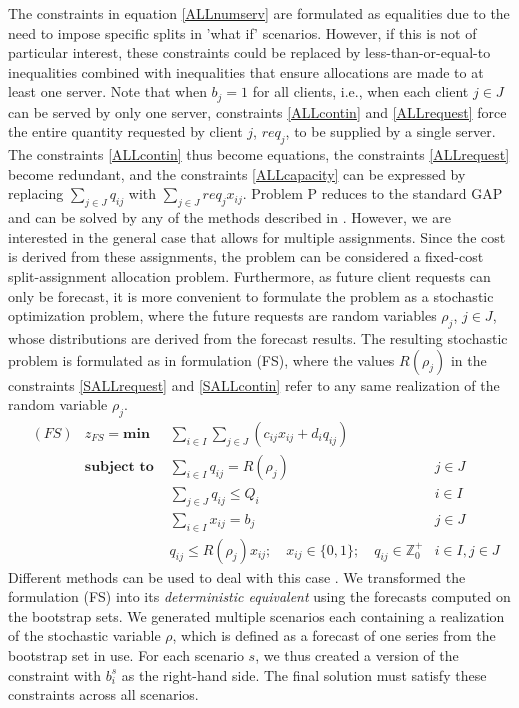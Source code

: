 \documentclass[ijoc,sglanonrev]{informs4}
\begin{document}
{ 
The constraints in equation \ref{ALLnumserv} are formulated as equalities due to the need to impose specific splits in 'what if' scenarios. However, if this is not of particular interest, these constraints could be replaced by less-than-or-equal-to inequalities combined with inequalities that ensure allocations are made to at least one server.
Note that when $b_j = 1$ for all clients, i.e., when each client $j \in J$ can be served by only one server, constraints \ref{ALLcontin} and \ref{ALLrequest} force the entire quantity requested by client $j$, $req_j$, to be supplied by a single server. The constraints \ref{ALLcontin} thus become equations, the constraints \ref{ALLrequest} become redundant, and the constraints \ref{ALLcapacity} can be expressed by replacing $\sum_{j \in J}q_{ij}$ with $\sum_{j \in J}req_j x_{ij}$. Problem P reduces to the standard GAP and can be solved by any of the methods described in \citet{matheuristics}.
}
However, we are interested in the general case that allows for multiple assignments. Since the cost is derived from these assignments, the problem can be considered a fixed-cost split-assignment allocation problem.
Furthermore, as future client requests can only be forecast, it is more convenient to formulate the problem as a stochastic optimization problem, where the future requests are random variables $\rho_j$, $j \in J$, whose distributions are derived from the forecast results. The resulting stochastic problem is formulated as in formulation (FS), where the values $R(\rho_j)$ in the constraints \ref{SALLrequest} and \ref{SALLcontin} refer to any same realization of the random variable $\rho_j$.
\begin{align}
	&(FS) & z_{FS} = \textbf{min } & \sum_{i \in I} \sum_{j \in J} ( c_{ij}x_{ij} + d_i q_{ij} ) \label{SALLobj}\\
	& &  \textbf{subject to }
	& \sum_{i \in I} q_{ij} = R(\rho_j) & j \in J  \label{SALLrequest}\\
	& &  & \sum_{j \in J}q_{ij} \leq Q_i & i \in I \label{SALLcapacity}\\
	& &  & \sum_{i \in I} x_{ij} = b_j & j \in J  \label{SALLnumserv}\\
	& &  & q_{ij} \leq R(\rho_j) x_{ij}; \quad  x_{ij} \in \{0,1\}; \quad q_{ij} \in \mathbb{Z}^+_0 & i \in I, j \in J \label{SALLcontin}
\end{align}
Different methods can be used to deal with this case \citep{SDR09}. We transformed the formulation (FS) into its {\it deterministic equivalent} \citep{D55} using the forecasts computed on the bootstrap sets. We generated multiple scenarios each containing a realization of the stochastic variable $\rho$, which is defined as a forecast of one series from the bootstrap set in use. For each scenario $s$, we thus created a version of the constraint with $b_i^{s}$ as the right-hand side. The final solution must satisfy these constraints across all scenarios.
\end{document}

